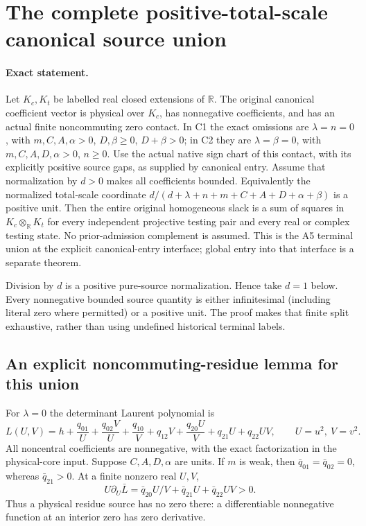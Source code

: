 \section{The complete positive-total-scale canonical source union}
\label{sec:positive-scale-union-rederived}

\paragraph{Exact statement.}
Let \(K_c,K_t\) be labelled real closed extensions of \(\mathbb R\).
The original canonical coefficient vector is physical over \(K_c\),
has nonnegative coefficients, and has an actual finite noncommuting
zero contact. In C1 the exact omissions are \(\lambda=n=0\),
with \(m,C,A,\alpha>0\), \(D,\beta\geq0\), \(D+\beta>0\);
in C2 they are \(\lambda=\beta=0\), with
\(m,C,A,D,\alpha>0\), \(n\geq0\).
Use the actual native sign chart of this contact, with its explicitly
positive source gaps, as supplied by canonical entry.
Assume that normalization by \(d>0\) makes all coefficients bounded.
Equivalently the normalized total-scale coordinate
\(d/(d+\lambda+n+m+C+A+D+\alpha+\beta)\) is a positive unit.
Then the entire original homogeneous slack is a sum of squares
in \(K_c\otimes_{\mathbb R}K_t\) for every independent projective
testing pair and every real or complex testing state.
No prior-admission complement is assumed.
This is the A5 terminal union at the explicit canonical-entry interface;
global entry into that interface is a separate theorem.

Division by \(d\) is a positive pure-source normalization.
Hence take \(d=1\) below. Every nonnegative bounded source quantity
is either infinitesimal (including literal zero where permitted)
or a positive unit. The proof makes that finite split exhaustive,
rather than using undefined historical terminal labels.

\subsection{An explicit noncommuting-residue lemma for this union}

For \(\lambda=0\) the determinant Laurent polynomial is
\[
 L(U,V)=h+\frac{q_{01}}U+\frac{q_{02}V}U+\frac{q_{10}}V
       +q_{12}V+\frac{q_{20}U}V+q_{21}U+q_{22}UV ,
 \qquad U=u^2,\ V=v^2.
 \tag{AU1}
\]
All noncentral coefficients are nonnegative, with the exact
factorization in the physical-core input.
Suppose \(C,A,D,\alpha\) are units.
If \(m\) is weak, then \(\bar q_{01}=\bar q_{02}=0\), whereas
\(\bar q_{21}>0\). At a finite nonzero real \(U,V\),
\[
 U\partial_U\bar L
   =\bar q_{20}U/V+\bar q_{21}U+\bar q_{22}UV>0.
 \tag{AU2}
\]
Thus a physical residue source has no zero there:
a differentiable nonnegative function at an interior zero
has zero derivative.

